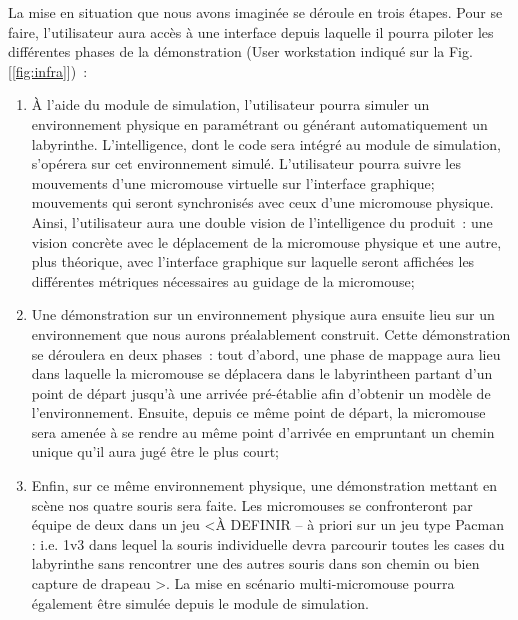 
\vspace{5mm}
La mise en situation que nous avons imaginée se déroule en trois 
étapes. Pour se faire, l'utilisateur aura accès à une interface depuis 
laquelle il pourra piloter les différentes phases de la démonstration 
(User workstation indiqué sur la Fig.[\ref{fig:infra}]) : \\

\begin{enumerate}
	\item À l’aide du module de simulation, l’utilisateur pourra simuler 
un environnement physique  en paramétrant ou générant automatiquement 
un labyrinthe. L’intelligence, dont le code sera intégré au module de 
simulation, s’opérera sur cet environnement simulé. L’utilisateur pourra 
suivre les mouvements d’une micromouse virtuelle sur l’interface graphique; 
mouvements qui seront synchronisés avec ceux d’une micromouse physique. Ainsi, 
l’utilisateur aura une double vision de l’intelligence du produit : une vision 
concrète avec le déplacement de la micromouse physique et une autre, plus théorique, 
avec l’interface graphique sur laquelle seront affichées les différentes métriques 
nécessaires au guidage de la micromouse; \\


	\item Une démonstration sur un environnement physique aura ensuite lieu sur 
un environnement que nous aurons préalablement construit. Cette démonstration se 
déroulera en deux phases : tout d’abord, une phase de mappage aura lieu dans laquelle 
la micromouse se déplacera dans le labyrintheen partant d’un point de départ jusqu’à 
une arrivée pré-établie afin d’obtenir un modèle de l’environnement. Ensuite, depuis 
ce même point de départ, la micromouse sera amenée à se rendre au même point d’arrivée 
en empruntant un chemin unique qu’il aura jugé être le plus court; \\


	\item Enfin, sur ce même environnement physique, une démonstration mettant en scène 
nos quatre souris sera faite. Les micromouses se confronteront par équipe de deux dans 
un jeu <À DEFINIR – à priori sur un jeu type Pacman : i.e. 1v3 dans lequel la souris individuelle 
devra parcourir toutes les cases du labyrinthe sans rencontrer une des autres souris dans son chemin 
ou bien capture de drapeau >. La mise en scénario multi-micromouse pourra également être simulée 
depuis le module de simulation. \\

\end{enumerate}

